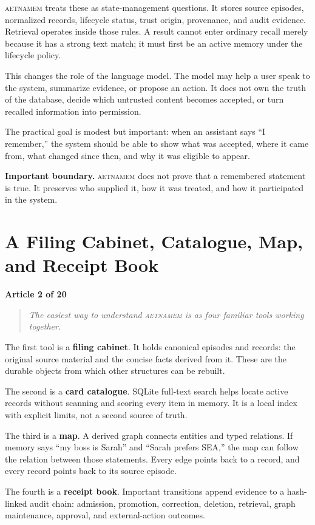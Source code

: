 \documentclass[11pt]{article}
\newcommand{\system}{\textsc{aetnamem}}
\newcommand{\articlelabel}[1]{%
  \noindent\colorbox{aetnaTeal!10}{%
    \parbox{0.96\textwidth}{\color{aetnaInk}\small\textbf{Article #1 of 20}}}%
  \par\medskip}
\newcommand{\coreidea}[1]{%
  \begin{quote}\color{aetnaTeal}\large\itshape #1\end{quote}}
\newcommand{\boundary}[1]{%
  \par\smallskip\noindent\textbf{Important boundary.} #1}
\begin{document}
\system{} treats these as state-management questions. It stores source
episodes, normalized records, lifecycle status, trust origin, provenance, and
audit evidence. Retrieval operates inside those rules. A result cannot enter
ordinary recall merely because it has a strong text match; it must first be an
active memory under the lifecycle policy.

This changes the role of the language model. The model may help a user speak
to the system, summarize evidence, or propose an action. It does not own the
truth of the database, decide which untrusted content becomes accepted, or
turn recalled information into permission.

The practical goal is modest but important: when an assistant says ``I
remember,'' the system should be able to show what was accepted, where it came
from, what changed since then, and why it was eligible to appear.

\boundary{\system{} does not prove that a remembered statement is true. It
preserves who supplied it, how it was treated, and how it participated in the
system.}

\clearpage
\section{A Filing Cabinet, Catalogue, Map, and Receipt Book}
\articlelabel{2}
\coreidea{The easiest way to understand \system{} is as four familiar tools
working together.}

The first tool is a \textbf{filing cabinet}. It holds canonical episodes and
records: the original source material and the concise facts derived from it.
These are the durable objects from which other structures can be rebuilt.

The second is a \textbf{card catalogue}. SQLite full-text search helps locate
active records without scanning and scoring every item in memory. It is a
local index with explicit limits, not a second source of truth.

The third is a \textbf{map}. A derived graph connects entities and typed
relations. If memory says ``my boss is Sarah'' and ``Sarah prefers SEA,'' the
map can follow the relation between those statements. Every edge points back
to a record, and every record points back to its source episode.

The fourth is a \textbf{receipt book}. Important transitions append evidence
to a hash-linked audit chain: admission, promotion, correction, deletion,
retrieval, graph maintenance, approval, and external-action outcomes.
\end{document}
